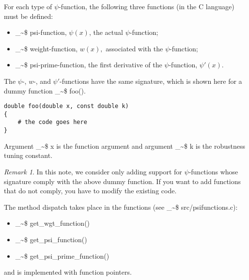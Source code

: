 \documentclass[a4paper,oneside,11pt,DIV=12]{scrartcl}
\makeatletter
\theoremstyle{remark}
\newtheorem*{rem}{Remark}
\newcommand\code{\bgroup\@makeother\_\@makeother\~\@makeother\$\@makeother\^\@codex}
\def\@codex#1{{\normalfont\ttfamily\hyphenchar\font=-1 #1}\egroup}
\makeatother
\begin{document}
\noindent For each type of $\psi$-function, the following three functions (in
the C language) must be defined:

\begin{itemize}
    \item \code{psi}-function, $\psi(x)$, the actual $\psi$-function;
    \item \code{weight}-function, $w(x),$ associated with the $\psi$-function;
    \item \code{psi-prime}-function, the first derivative of the
        $\psi$-function, $\psi'(x)$.
\end{itemize}

\noindent The $\psi$-, $w$-, and $\psi'$-functions have the same signature,
which is shown here for a dummy function \code{foo()}.

\begin{verbatim}
double foo(double x, const double k)
{
    # the code goes here
}
\end{verbatim}

\noindent Argument \code{x} is the function argument and argument \code{k} is
the robustness tuning constant.

\begin{rem}
In this note, we consider only adding support for $\psi$-functions whose
signature comply with the above dummy function.  If you want to add
functions that do not comply, you have to modify the existing code.
\end{rem}

\noindent The method dispatch takes place in the functions (see
\code{src/psifunctions.c}):

\begin{itemize}
    \item \code{get_wgt_function()}
    \item \code{get_psi_function()}
    \item \code{get_psi_prime_function()}
\end{itemize}
\noindent and is implemented with function pointers.

\clearpage


\end{document}
